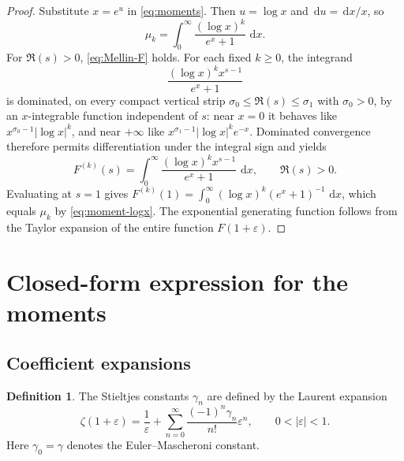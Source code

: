 \documentclass[11pt]{amsart}
\numberwithin{equation}{section}
\theoremstyle{definition}
\newtheorem{definition}[theorem]{Definition}
\newcommand{\dd}{\,\mathrm{d}}
\newcommand{\mom}[1]{\mu_{#1}}
\begin{document}
\begin{proof}
Substitute $x=e^{u}$ in \eqref{eq:moments}. Then $u=\log x$ and
$\dd u=\dd x/x$, so
\begin{equation}\label{eq:moment-logx}
\mom{k}
=\int_{0}^{\infty}\frac{(\log x)^{k}}{e^{x}+1}\,\dd x.
\end{equation}
For $\Re(s)>0$, \eqref{eq:Mellin-F} holds. For each fixed $k\ge 0$, the
integrand
\[
\frac{(\log x)^{k}x^{s-1}}{e^{x}+1}
\]
is dominated, on every compact vertical strip $\sigma_{0}\le\Re(s)\le\sigma_{1}$
with $\sigma_{0}>0$, by an $x$-integrable function independent of $s$:
near $x=0$ it behaves like $x^{\sigma_{0}-1}|\log x|^{k}$, and near $+\infty$
like $x^{\sigma_{1}-1}|\log x|^{k}e^{-x}$. Dominated convergence therefore
permits differentiation under the integral sign and yields
\[
F^{(k)}(s)
=\int_{0}^{\infty}\frac{(\log x)^{k}x^{s-1}}{e^{x}+1}\,\dd x,
\qquad\Re(s)>0.
\]
Evaluating at $s=1$ gives $F^{(k)}(1)=\int_{0}^{\infty}(\log x)^{k}(e^{x}+1)^{-1}\,\dd x$,
which equals $\mom{k}$ by \eqref{eq:moment-logx}. The exponential generating
function follows from the Taylor expansion of the entire function
$F(1+\varepsilon)$.
\end{proof}

\section{Closed-form expression for the moments}

\subsection{Coefficient expansions}

\begin{definition}\label{def:stieltjes}
The Stieltjes constants $\gamma_{n}$ are defined by the Laurent expansion
\begin{equation}\label{eq:stieltjes}
\zeta(1+\varepsilon)
=\frac{1}{\varepsilon}
+\sum_{n=0}^{\infty}\frac{(-1)^{n}\gamma_{n}}{n!}\varepsilon^{n},
\qquad 0<|\varepsilon|<1.
\end{equation}
Here $\gamma_{0}=\gamma$ denotes the Euler--Mascheroni constant.
\end{definition}
\end{document}
